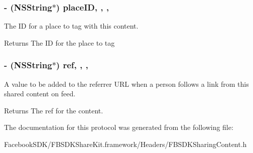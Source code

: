 \hypertarget{protocol_f_b_s_d_k_sharing_content-p_a8af542b311e24d38c73221d81d250399}{
\subsubsection[{place\-I\-D}]{\setlength{\rightskip}{0pt plus 5cm}-\/ (N\-S\-String$\ast$) place\-I\-D\hspace{0.3cm}{\ttfamily [read]}, {\ttfamily [write]}, {\ttfamily [nonatomic]}, {\ttfamily [copy]}}}\label{protocol_f_b_s_d_k_sharing_content-p_a8af542b311e24d38c73221d81d250399}
The I\-D for a place to tag with this content. \begin{DoxyReturn}{Returns}
The I\-D for the place to tag 
\end{DoxyReturn}
\hypertarget{protocol_f_b_s_d_k_sharing_content-p_a5ea294c3c5b2fd923d00ea95fc19a20d}{
\subsubsection[{ref}]{\setlength{\rightskip}{0pt plus 5cm}-\/ (N\-S\-String$\ast$) ref\hspace{0.3cm}{\ttfamily [read]}, {\ttfamily [write]}, {\ttfamily [nonatomic]}, {\ttfamily [copy]}}}\label{protocol_f_b_s_d_k_sharing_content-p_a5ea294c3c5b2fd923d00ea95fc19a20d}
A value to be added to the referrer U\-R\-L when a person follows a link from this shared content on feed. \begin{DoxyReturn}{Returns}
The ref for the content. 
\end{DoxyReturn}


The documentation for this protocol was generated from the following file\-:\begin{DoxyCompactItemize}
\item 
Facebook\-S\-D\-K/\-F\-B\-S\-D\-K\-Share\-Kit.\-framework/\-Headers/F\-B\-S\-D\-K\-Sharing\-Content.\-h\end{DoxyCompactItemize}
